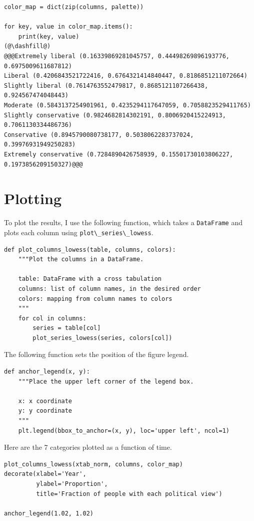 \begin{lstlisting}[]
color_map = dict(zip(columns, palette))

for key, value in color_map.items():
    print(key, value)
(@\dashfill@)
@@@Extremely liberal (0.16339869281045757, 0.44498269896193776, 0.6975009611687812)
Liberal (0.4206843521722416, 0.6764321414840447, 0.8186851211072664)
Slightly liberal (0.7614763552479817, 0.8685121107266438, 0.924567474048443)
Moderate (0.5843137254901961, 0.4235294117647059, 0.7058823529411765)
Slightly conservative (0.9824682814302191, 0.8006920415224913, 0.7061130334486736)
Conservative (0.8945790080738177, 0.5038062283737024, 0.39976931949250283)
Extremely conservative (0.7284890426758939, 0.15501730103806227, 0.1973856209150327)@@@
\end{lstlisting}

\hypertarget{plotting}{%
\section{Plotting}\label{plotting}}

To plot the results, I use the following function, which takes a
\passthrough{\lstinline!DataFrame!} and plots each column using
\passthrough{\lstinline!plot\_series\_lowess!}.

\begin{lstlisting}[]
def plot_columns_lowess(table, columns, colors):
    """Plot the columns in a DataFrame.
    
    table: DataFrame with a cross tabulation
    columns: list of column names, in the desired order
    colors: mapping from column names to colors
    """
    for col in columns:
        series = table[col]
        plot_series_lowess(series, colors[col])
\end{lstlisting}

The following function sets the position of the figure legend.

\begin{lstlisting}[]
def anchor_legend(x, y):
    """Place the upper left corner of the legend box.
    
    x: x coordinate
    y: y coordinate
    """
    plt.legend(bbox_to_anchor=(x, y), loc='upper left', ncol=1)
\end{lstlisting}

Here are the 7 categories plotted as a function of time.

\begin{lstlisting}[]
plot_columns_lowess(xtab_norm, columns, color_map)
decorate(xlabel='Year',
         ylabel='Proportion',
         title='Fraction of people with each political view')

anchor_legend(1.02, 1.02)
\end{lstlisting}

